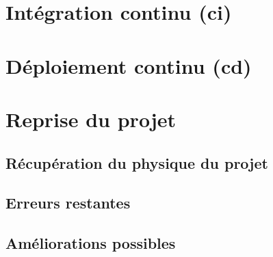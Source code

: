 \documentclass[
    iai, %
    il, %
]{heig-tb}
\begin{document}






\chapter{Intégration continu (\Gls{ci})}


\chapter{Déploiement continu (\Gls{cd})}

\chapter{Reprise du projet}

\section{Récupération du physique du projet}

\section{Erreurs restantes}

\section{Améliorations possibles}
\end{document}
